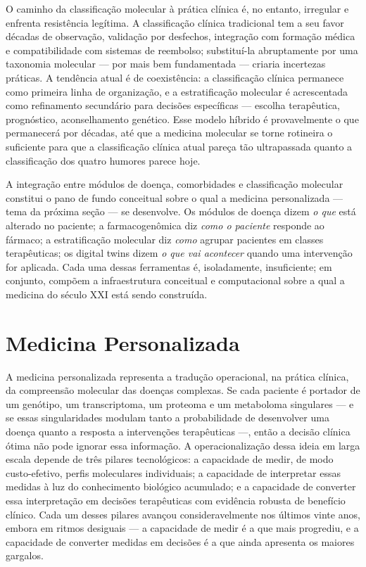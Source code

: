O caminho da classificação molecular à prática clínica é, no entanto, irregular e enfrenta resistência legítima. A classificação clínica tradicional tem a seu favor décadas de observação, validação por desfechos, integração com formação médica e compatibilidade com sistemas de reembolso; substituí-la abruptamente por uma taxonomia molecular --- por mais bem fundamentada --- criaria incertezas práticas. A tendência atual é de coexistência: a classificação clínica permanece como primeira linha de organização, e a estratificação molecular é acrescentada como refinamento secundário para decisões específicas --- escolha terapêutica, prognóstico, aconselhamento genético. Esse modelo híbrido é provavelmente o que permanecerá por décadas, até que a medicina molecular se torne rotineira o suficiente para que a classificação clínica atual pareça tão ultrapassada quanto a classificação dos quatro humores parece hoje.

A integração entre módulos de doença, comorbidades e classificação molecular constitui o pano de fundo conceitual sobre o qual a medicina personalizada --- tema da próxima seção --- se desenvolve. Os módulos de doença dizem \emph{o que} está alterado no paciente; a farmacogenômica diz \emph{como o paciente} responde ao fármaco; a estratificação molecular diz \emph{como} agrupar pacientes em classes terapêuticas; os digital twins dizem \emph{o que vai acontecer} quando uma intervenção for aplicada. Cada uma dessas ferramentas é, isoladamente, insuficiente; em conjunto, compõem a infraestrutura conceitual e computacional sobre a qual a medicina do século XXI está sendo construída.


\section{Medicina Personalizada}
\label{sec:13-personalizada}

A medicina personalizada representa a tradução operacional, na prática clínica, da compreensão molecular das doenças complexas. Se cada paciente é portador de um genótipo, um transcriptoma, um proteoma e um metaboloma singulares --- e se essas singularidades modulam tanto a probabilidade de desenvolver uma doença quanto a resposta a intervenções terapêuticas ---, então a decisão clínica ótima não pode ignorar essa informação. A operacionalização dessa ideia em larga escala depende de três pilares tecnológicos: a capacidade de medir, de modo custo-efetivo, perfis moleculares individuais; a capacidade de interpretar essas medidas à luz do conhecimento biológico acumulado; e a capacidade de converter essa interpretação em decisões terapêuticas com evidência robusta de benefício clínico. Cada um desses pilares avançou consideravelmente nos últimos vinte anos, embora em ritmos desiguais --- a capacidade de medir é a que mais progrediu, e a capacidade de converter medidas em decisões é a que ainda apresenta os maiores gargalos.

